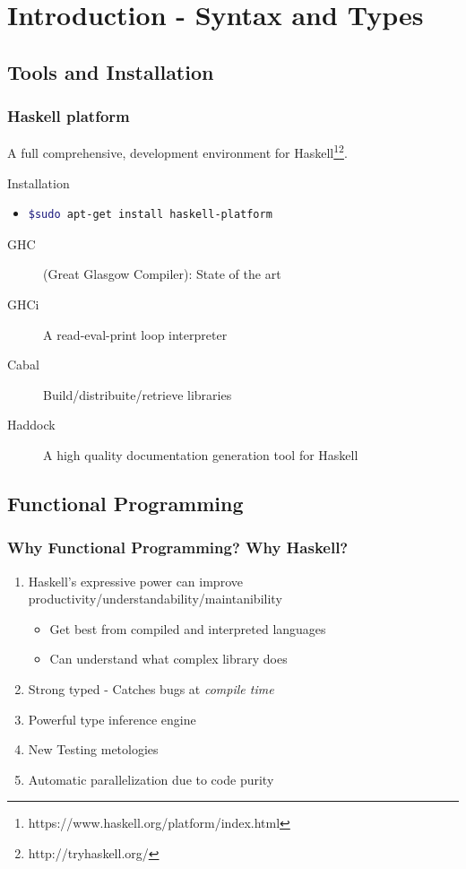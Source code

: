 \section{Introduction - Syntax and Types} 
\frame{\sectionpage}

\subsection{Tools and Installation}
		\begin{frame}[fragile]\frametitle{Haskell platform}
		A full comprehensive, development environment for
		Haskell\footnote{https://www.haskell.org/platform/index.html}\footnote{http://tryhaskell.org/}.
		
			\begin{block}{Installation}
			\begin{itemize}
			  \item 
				\begin{lstlisting}[language=bash]
					$sudo apt-get install haskell-platform
				\end{lstlisting}
			\end{itemize}
			\end{block}
			
			\begin{description}
			  \item[GHC]
			  	 (Great Glasgow Compiler): State of the art
			  \item[GHCi]
			  	 A read-eval-print loop interpreter
			  \item[Cabal]
			   	Build/distribuite/retrieve libraries
			  \item[Haddock]
			   		A high quality documentation generation tool for Haskell 
			\end{description}
\end{frame}

\subsection{Functional Programming}
\begin{frame}\frametitle{Why Functional Programming? Why Haskell?} 
		\begin{enumerate}
		  \item Haskell's expressive power can improve
		  productivity/understandability/maintanibility
				\begin{itemize}
			    \item Get best from compiled and interpreted languages
			    \item Can understand what complex library does
			  \end{itemize}
		\item Strong typed - Catches bugs at \emph{compile time}
		\item Powerful type inference engine
		\item New Testing metologies
		\item Automatic parallelization due to code purity
		\end{enumerate}
	\end{frame}
	

